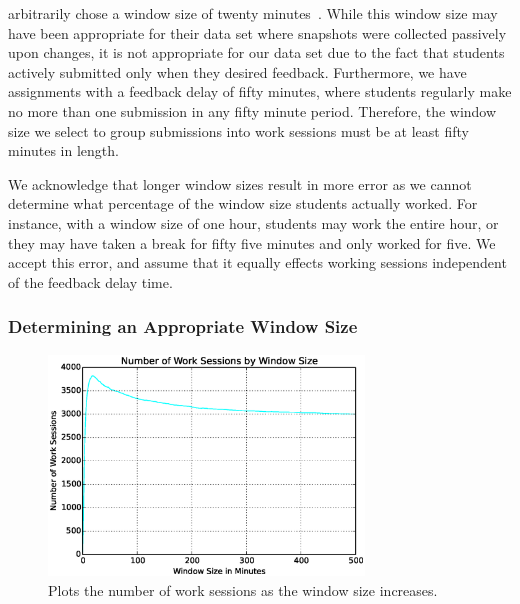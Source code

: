 \spacco{} arbitrarily chose a window size of twenty
minutes~\cite{Spacco:2013:TIP:2462476.2465594}. While this window size may have
been appropriate for their data set where snapshots were collected passively
upon changes, it is not appropriate for our data set due to the fact that
students actively submitted only when they desired feedback. Furthermore, we
have assignments with a feedback delay of fifty minutes, where students
regularly make no more than one submission in any fifty minute
period. Therefore, the window size we select to group submissions into work
sessions must be at least fifty minutes in length.

We acknowledge that longer window sizes result in more error as we cannot
determine what percentage of the window size students actually worked. For
instance, with a window size of one hour, students may work the entire hour, or
they may have taken a break for fifty five minutes and only worked for five. We
accept this error, and assume that it equally effects working sessions
independent of the feedback delay time.

\subsubsection{Determining an Appropriate Window Size}

\begin{figure}[!t]
\centering \includegraphics[width=3.3in]{graphs/Number_of_Work_Sessions_by_Window_Size.eps}
\caption{Plots the number of work sessions as the window size increases.}
\end{figure}

